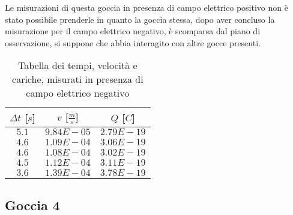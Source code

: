 \documentclass{article}
\begin{document}
\begin{multicols}{2}

Le misurazioni di questa goccia in presenza di campo elettrico positivo non è stato possibile prenderle in quanto la goccia stessa, dopo aver concluso la misurazione per il campo elettrico negativo, è scomparsa dal piano di osservazione, si suppone che abbia interagito con altre gocce presenti.

\columnbreak

\begin{table}[H]
	\centering
	\begin{tabular}{| c | c | c |}
		\hline
		$\Delta t$ [$s$] & $v$ [$\frac ms$] & $Q$ [$C$] \\
		\hline
		$5.1$ & $9.84E-05$ & $2.79E-19$ \\
		$4.6$ & $1.09E-04$ & $3.06E-19$ \\
		$4.6$ & $1.08E-04$ & $3.02E-19$ \\
		$4.5$ & $1.12E-04$ & $3.11E-19$ \\
		$3.6$ & $1.39E-04$ & $3.78E-19$ \\
		\hline		
	\end{tabular}
	\caption{Tabella dei tempi, velocità e cariche, misurati in presenza di campo elettrico negativo}
	\label{}
\end{table}
	
\end{multicols}

\subsection{Goccia 4}
\end{document}
